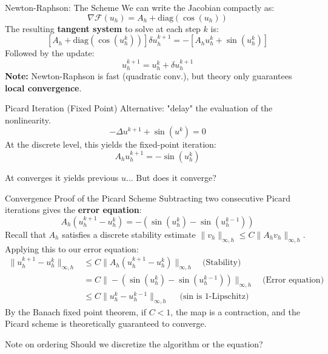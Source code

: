 \documentclass[aspectratio=169]{beamer}
\begin{document}
\begin{frame}{Newton-Raphson: The Scheme}
    We can write the Jacobian compactly as:
    \[
        \nabla \mathcal{F}(u_h) = A_h + \text{diag}(\cos(u_h))
    \]
    The resulting \textbf{tangent system} to solve at each step $k$ is:
    \[
        \left[ A_h + \text{diag}(\cos(u_h^k)) \right] \delta u_h^{k+1} = - \left[ A_h u_h^k + \sin(u_h^k) \right]
    \]
    Followed by the update:
    \[
        u_h^{k+1} = u_h^k + \delta u_h^{k+1}
    \]
    \vspace{0.3cm}
    \textbf{Note:} Newton-Raphson is fast (quadratic conv.), but theory only guarantees \textbf{local convergence}.
\end{frame}

\begin{frame}{Picard Iteration (Fixed Point)}
    Alternative: "delay" the evaluation of the nonlinearity.     
    \[
        -\Delta u^{k+1} + \sin(u^k) = 0
    \]
    At the discrete level, this yields the fixed-point iteration:
    \[
        A_h u_h^{k+1} = - \sin(u_h^k)
    \]
    
    At converges it yields previous $u$... But does it converge?
\end{frame}

\begin{frame}{Convergence Proof of the Picard Scheme}
    Subtracting two consecutive Picard iterations gives the \textbf{error equation}:
    \[
        A_h (u_h^{k+1} - u_h^k) = -(\sin(u_h^k) - \sin(u_h^{k-1}))
    \]
    Recall that $A_h$ satisfies a discrete stability estimate $\|v_h\|_{\infty,h} \le C \|A_h v_h\|_{\infty,h}$. Applying this to our error equation:
    \begin{align*}
        \|u_h^{k+1} - u_h^k\|_{\infty,h} &\le C \|A_h(u_h^{k+1} - u_h^k)\|_{\infty,h} \quad \text{(Stability)} \\
        &= C \|-(\sin(u_h^k) - \sin(u_h^{k-1}))\|_{\infty,h} \quad \text{(Error equation)} \\
        &\le C \|u_h^k - u_h^{k-1}\|_{\infty,h} \quad \text{($\sin$ is 1-Lipschitz)}
    \end{align*}
    By the Banach fixed point theorem, if $C < 1$, the map is a contraction, and the Picard scheme is theoretically guaranteed to converge.
\end{frame}

\begin{frame}{Note on ordering}
    Should we discretize the algorithm or the equation?
\end{frame}
\end{document}
